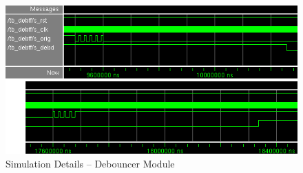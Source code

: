 \documentclass[a4paper,10pt]{scrartcl}
\begin{document}
\begin{figure}[ht]
	\centering
	\includegraphics[keepaspectratio,width=\textwidth]{debff01}
	\caption{Simulation Details -- Debouncer Module}
	\label{fig:debff01}
\end{figure}
\end{document}

